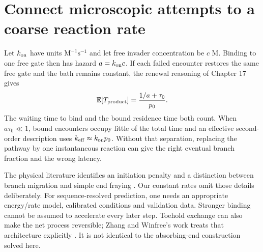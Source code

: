 \section{Connect microscopic attempts to a coarse reaction rate}
Let $k_{\rm on}$ have units $\mathrm{M}^{-1}\mathrm{s}^{-1}$ and let free
invader concentration be $c$ M. Binding to one free gate then has hazard
$a=k_{\rm on}c$. If each failed encounter restores the same free gate and
the bath remains constant, the renewal reasoning of Chapter 17 gives
\begin{equation}
 \mathbb E[T_{\rm product}]=\frac{1/a+\tau_0}{p_0}.
 \label{eq:renewal}
\end{equation}
The waiting time to bind and the bound residence time both count. When
$a\tau_0\ll1$, bound encounters occupy little of the total time and an
effective second-order description uses $k_{\rm eff}\approx k_{\rm on}p_0$.
Without that separation, replacing the pathway by one instantaneous reaction
can give the right eventual branch fraction and the wrong latency.

The physical literature identifies an initiation penalty and a distinction
between branch migration and simple end fraying \cite{Srinivas2013}. Our constant
rates omit those details deliberately. For sequence-resolved prediction, one
needs an appropriate energy/rate model, calibrated conditions and validation
data. Stronger binding cannot be assumed to accelerate every later step.
Toehold exchange can also make the net process reversible; Zhang and Winfree's
work treats that architecture explicitly \cite{ZhangWinfree2009}. It is not identical to
the absorbing-end construction solved here.


